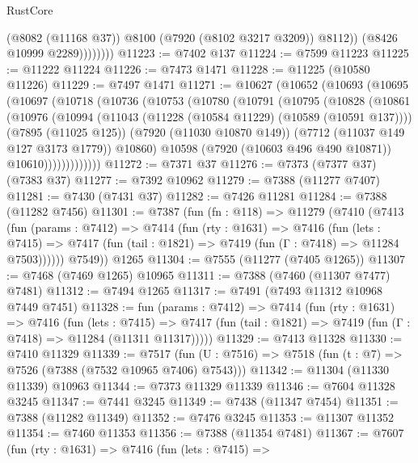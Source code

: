 \begin{lexlean}{RustCore}
\begin{coremodule}
                      (@8082 (@11168 @37))
                      @8100
                      (@7920 (@8102 @3217 @3209))
                      @8112))
                  (@8426 @10999 @2289))))))))
@11223 := @7402 @137
@11224 := @7599 @11223
@11225 := @11222 @11224
@11226 := @7473 @1471
@11228 := @11225 (@10580 @11226)
@11229 := @7497 @1471
@11271 := @10627
    (@10652
      (@10693
        (@10695
          (@10697
            (@10718
              (@10736
                (@10753
                  (@10780
                    (@10791
                      (@10795
                        (@10828
                          (@10861
                            (@10976
                              (@10994
                                (@11043 (@11228 (@10584 @11229) (@10589 (@10591 @137))))
                                (@7895 (@11025 @125))
                                (@7920 (@11030 @10870 @149))
                                (@7712 (@11037 @149 @127 @3173 @1779))
                                @10860)
                              @10598
                              (@7920 (@10603 @496 @490 @10871))
                              @10610)))))))))))))
@11272 := @7371 @37
@11276 := @7373 (@7377 @37) (@7383 @37)
@11277 := @7392 @10962
@11279 := @7388 (@11277 @7407)
@11281 := @7430 (@7431 @37)
@11282 := @7426 @11281
@11284 := @7388 (@11282 @7456)
@11301 := @7387
    (fun (fn : @118) =>
    @11279
      (@7410
        (@7413
          (fun (params : @7412) =>
          @7414
            (fun (rty : @1631) =>
            @7416
              (fun (lets : @7415) =>
              @7417 (fun (tail : @1821) => @7419 (fun (Γ : @7418) => @11284 @7503))))))
        @7549))
    @1265
@11304 := @7555 (@11277 (@7405 @1265))
@11307 := @7468 (@7469 @1265) @10965
@11311 := @7388 (@7460 (@11307 @7477) @7481)
@11312 := @7494 @1265
@11317 := @7491 (@7493 @11312 @10968 @7449 @7451)
@11328 := fun (params : @7412) =>
  @7414
    (fun (rty : @1631) =>
    @7416
      (fun (lets : @7415) =>
      @7417 (fun (tail : @1821) => @7419 (fun (Γ : @7418) => @11284 (@11311 @11317)))))
@11329 := @7413 @11328
@11330 := @7410 @11329
@11339 := @7517
    (fun (U : @7516) => @7518 (fun (t : @7) => @7526 (@7388 (@7532 @10965 @7406) @7543)))
@11342 := @11304 (@11330 @11339) @10963
@11344 := @7373 @11329 @11339
@11346 := @7604 @11328 @3245
@11347 := @7441 @3245
@11349 := @7438 (@11347 @7454)
@11351 := @7388 (@11282 @11349)
@11352 := @7476 @3245
@11353 := @11307 @11352
@11354 := @7460 @11353
@11356 := @7388 (@11354 @7481)
@11367 := @7607
    (fun (rty : @1631) =>
    @7416
      (fun (lets : @7415) =>

\end{coremodule}
\end{lexlean}
